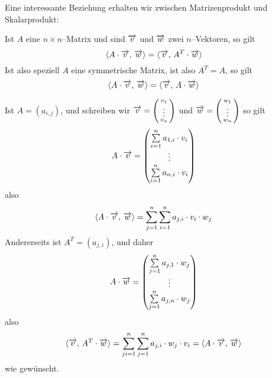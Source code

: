 \medbreak

Eine interessante Beziehung erhalten wir zwischen Matrizenprodukt und Skalarprodukt:

\begin{regel}\label{matrix_skalarprod} 
Ist $A$ eine $n \times n$--Matrix und sind $\overrightarrow{v}$ und  $\overrightarrow{w}$ 
zwei $n$--Vektoren, so gilt
  	$$ \langle A \cdot  \overrightarrow{v}, \, \overrightarrow{w} \rangle = 
      	\langle  \overrightarrow{v}, \,  A^T \cdot \overrightarrow{w} \rangle $$
Ist also speziell $A$ eine symmetrische Matrix, ist also $A^T = A$, so gilt
  	$$ \langle A \cdot  \overrightarrow{v}, \, \overrightarrow{w} \rangle = 
    	\langle  \overrightarrow{v}, \,  A \cdot \overrightarrow{w} \rangle $$
\end{regel}

\beweis Ist $A = \left(a_{i,j}\right)$, und schreiben wir $\overrightarrow{v} = 
\left( \begin{smallmatrix} v_1 \\ \vdots \\ v_n \end{smallmatrix} \right)$ und 
$\overrightarrow{w} = 
\left( \begin{smallmatrix} w_1 \\ \vdots \\ w_n \end{smallmatrix} \right)$
so gilt
  	$$ A \cdot \overrightarrow{v} = \left( \begin{matrix} \sum\limits_{i = 1}^n a_{1,i} \cdot v_i \\ \vdots \\ 
   	\sum\limits_{i = 1}^n a_{n,i} \cdot v_i  \end{matrix} \right) $$
also 
  $$ \langle A \cdot  \overrightarrow{v}, \, \overrightarrow{w} \rangle = \sum\limits_{j = 1}^n 
      \sum\limits_{i = 1}^n a_{j,i} \cdot v_i \cdot w_j $$
Andererseits ist $A^T = \left( a_{j,i} \right)$, und daher
  	$$  A \cdot \overrightarrow{w} = \left( \begin{matrix} \sum\limits_{j = 1}^n a_{j,1} \cdot w_j \\ \vdots \\ 	
   	\sum\limits_{j = 1}^n a_{j,n} \cdot w_j  \end{matrix} \right) $$
also 
  	$$ \langle  \overrightarrow{v}, \, A^T \cdot \overrightarrow{w} \rangle = \sum\limits_{ji= 1}^n 
    	\sum\limits_{j = 1}^n a_{j,i} \cdot w_j \cdot v_i = \langle A \cdot  \overrightarrow{v}, \, 
     	\overrightarrow{w} \rangle  $$
wie gewünscht.

\bigbreak

